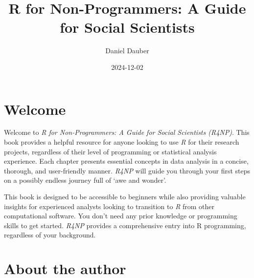 \documentclass[
  letterpaper,
]{krantz}
\title{R for Non-Programmers: A Guide for Social Scientists}
\author{Daniel Dauber}
\date{2024-12-02}
\renewcommand*\contentsname{Table of contents}
\newcommand\contentsname{Table of contents}
\begin{document}
\maketitle


\thispagestyle{empty}

\begin{center}
\end{center}

\setlength{\abovedisplayskip}{-5pt}
\setlength{\abovedisplayshortskip}{-5pt}

\renewcommand*\contentsname{Table of contents}
{
\hypersetup{linkcolor=}
\setcounter{tocdepth}{2}
\tableofcontents
}

\chapter*{Welcome}\label{welcome}


Welcome to \emph{R for Non-Programmers: A Guide for Social Scientists
(R4NP)}. This book provides a helpful resource for anyone looking to use
\emph{R} for their research projects, regardless of their level of
programming or statistical analysis experience. Each chapter presents
essential concepts in data analysis in a concise, thorough, and
user-friendly manner. \emph{R4NP} will guide you through your first
steps on a possibly endless journey full of `awe and wonder'.

This book is designed to be accessible to beginners while also providing
valuable insights for experienced analysts looking to transition to
\emph{R} from other computational software. You don't need any prior
knowledge or programming skills to get started. \emph{R4NP} provides a
comprehensive entry into R programming, regardless of your background.

\mainmatter


\chapter*{About the author}\label{about-the-author}
\end{document}
